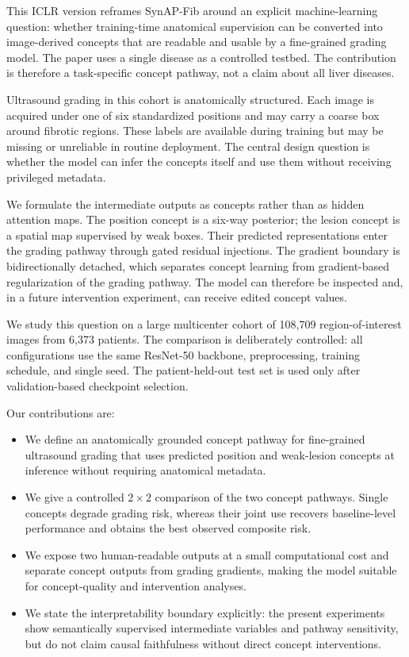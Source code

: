 This ICLR version reframes SynAP-Fib around an explicit machine-learning question: whether training-time anatomical supervision can be converted into image-derived concepts that are readable and usable by a fine-grained grading model. The paper uses a single disease as a controlled testbed. The contribution is therefore a task-specific concept pathway, not a claim about all liver diseases.

Ultrasound grading in this cohort is anatomically structured. Each image is acquired under one of six standardized positions and may carry a coarse box around fibrotic regions. These labels are available during training but may be missing or unreliable in routine deployment. The central design question is whether the model can infer the concepts itself and use them without receiving privileged metadata.

We formulate the intermediate outputs as concepts rather than as hidden attention maps. The position concept is a six-way posterior; the lesion concept is a spatial map supervised by weak boxes. Their predicted representations enter the grading pathway through gated residual injections. The gradient boundary is bidirectionally detached, which separates concept learning from gradient-based regularization of the grading pathway. The model can therefore be inspected and, in a future intervention experiment, can receive edited concept values.

We study this question on a large multicenter cohort of 108,709 region-of-interest images from 6,373 patients. The comparison is deliberately controlled: all configurations use the same ResNet-50 backbone, preprocessing, training schedule, and single seed. The patient-held-out test set is used only after validation-based checkpoint selection.

Our contributions are:
\begin{itemize}
\item We define an anatomically grounded concept pathway for fine-grained ultrasound grading that uses predicted position and weak-lesion concepts at inference without requiring anatomical metadata.
\item We give a controlled $2\times2$ comparison of the two concept pathways. Single concepts degrade grading risk, whereas their joint use recovers baseline-level performance and obtains the best observed composite risk.
\item We expose two human-readable outputs at a small computational cost and separate concept outputs from grading gradients, making the model suitable for concept-quality and intervention analyses.
\item We state the interpretability boundary explicitly: the present experiments show semantically supervised intermediate variables and pathway sensitivity, but do not claim causal faithfulness without direct concept interventions.
\end{itemize}
